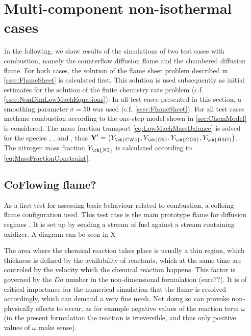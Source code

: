 \section{Multi-component non-isothermal cases}
In the following, we show results of the simulations of two test cases with combustion, namely the counterflow diffusion flame and the chambered diffusion flame. For both cases, the solution of the flame sheet problem described in \cref{ssec:FlameSheet} is calculated first. This solution is used subsequently as initial estimates for the solution of the finite chemistry rate problem (c.f. \cref{ssec:NonDimLowMachEquations}). In all test cases presented in this section, a smoothing parameter $\sigma = 50$ was used (c.f. \cref{ssec:FlameSheet}). For all test cases methane combustion according to the one-step model shown in \cref{sec:ChemModel} is considered. The mass fraction transport \cref{eq:LowMachMassBalance} is solved for the species , ,  and , thus $\vec{Y}' = \left(Y_{\ch{CH4}},Y_{\ch{O2}},Y_{\ch{CO2}},Y_{\ch{H2O}}\right)$. The nitrogen mass fraction $Y_{\ch{N2}}$ is calculated according to \cref{eq:MassFractionConstraint}. 



\subsection{CoFlowing flame?}

As a first test for assessing basic behaviour related to combustion, a cofloing flame configuration used. This test case is the main prototype flame for diffusion regimes \cite{poinsotTheoreticalNumericalCombustion2005}. It is set up by sending a stream of fuel against a stream containing oxidizer. A diagram can be seen in X


The area where the chemical reaction takes place is usually a thin region, which thickness is defined by the availability of reactants, which at the same time are controled by the velocity which the chemical reaction happens. This factor is governed by the $Da$ number in the non-dimensional formulation (sure??). It is of critical importance for the numerical simulation that the flame is resolved accordingly, which can demand a very fine mesh. Not doing so can provoke non-physically effects to occur, as for example negative values of the reaction term $\omega$ (in the present formulation the reaction is irreversible, and thus only positive values of $\omega$ make sense). 

